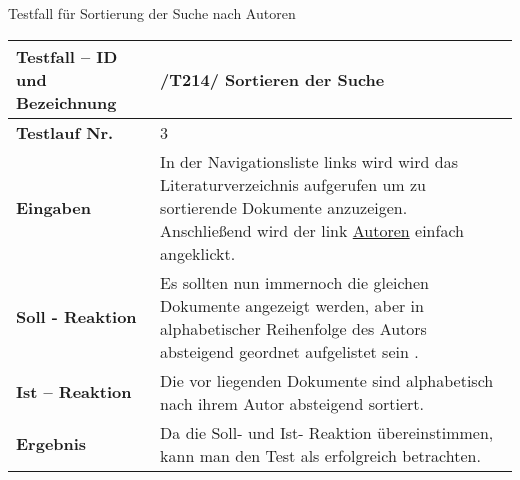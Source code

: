 Testfall für Sortierung der Suche nach Autoren\\ 
\begin{longtable}{|p{5cm}|p{10cm}|}
\hline
\textbf{Testfall -- ID und Bezeichnung} & \textnormal{/T214/ Sortieren der Suche} \\
\hline
\textbf{Testlauf Nr.} & \textnormal{3} \\
\hline
\textbf{Eingaben} & \textnormal{In der Navigationsliste links wird wird das Literaturverzeichnis aufgerufen um zu sortierende Dokumente anzuzeigen. Anschließend wird der link \uline{Autoren} einfach angeklickt.} \\
\hline
\textbf{Soll - Reaktion} & \textnormal{Es sollten nun immernoch die gleichen Dokumente angezeigt werden, aber in alphabetischer Reihenfolge des Autors absteigend geordnet aufgelistet sein .} \\
\hline
\textbf{Ist -- Reaktion} & \textnormal{Die vor liegenden Dokumente sind alphabetisch nach ihrem Autor absteigend sortiert.} \\
\hline
\textbf{Ergebnis} & \textnormal{Da die Soll- und Ist- Reaktion übereinstimmen, kann man den Test als erfolgreich betrachten.} \\
\hline
 \end{longtable}
